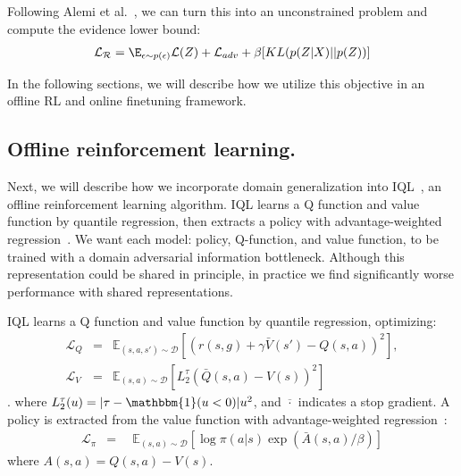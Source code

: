 Following Alemi et al.~\cite{alemi2017vib}, we can turn this into an unconstrained problem and compute the evidence lower bound:
\begin{eqnarray}
\mathcal{L_R} = \E_{\epsilon \sim p(\epsilon)} \mathcal{L}(Z) + \mathcal{L}_{adv} + \beta[KL(p(Z|X)||p(Z))] 
\end{eqnarray}

In the following sections, we will describe how we utilize this objective in an offline RL and online finetuning framework.


\subsection{Offline reinforcement learning.}

Next, we will describe how we incorporate domain generalization into IQL~\cite{kostrikov2021iql}, an offline reinforcement learning algorithm.
IQL learns a Q function and value function by quantile regression, then extracts a policy with advantage-weighted regression~\cite{peng2019awr}.
We want each model: policy, Q-function, and value function, to be trained with a domain adversarial information bottleneck. Although this representation could be shared in principle, in practice we find significantly worse performance with shared representations.

IQL learns a Q function and value function by quantile regression, optimizing:
\begin{eqnarray}
    \mathcal{L}_{Q} &=&  \mathbb{E}_{(s, a, s') \sim \mathcal{D}} \left[(r(s, g) + \gamma \bar{V}(s') - Q(s, a))^2 \right],  \\
    \mathcal{L}_{V} &=& \mathbb{E}_{(s, a) \sim \mathcal{D}} \left[L_2^\tau(\bar{Q}(s, a) - V(s))^2 \right] 
\end{eqnarray}.
where $L_2^\tau(u) = |\tau-\mathbbm{1}(u < 0)|u^2$, and $\overline{\cdot}$ indicates a stop gradient. A policy is extracted from the value function with advantage-weighted regression~\cite{peng2019awr}:
\begin{eqnarray}
    \mathcal{L}_{\pi} &=& 
    \enspace 
    \mathbb{E}_{(s, a) \sim \mathcal{D}} \left[\log \pi(a|s) \exp(\bar{A}(s, a)/\beta) \right]
\end{eqnarray}
where $A(s, a) = Q(s, a) - V(s)$.

